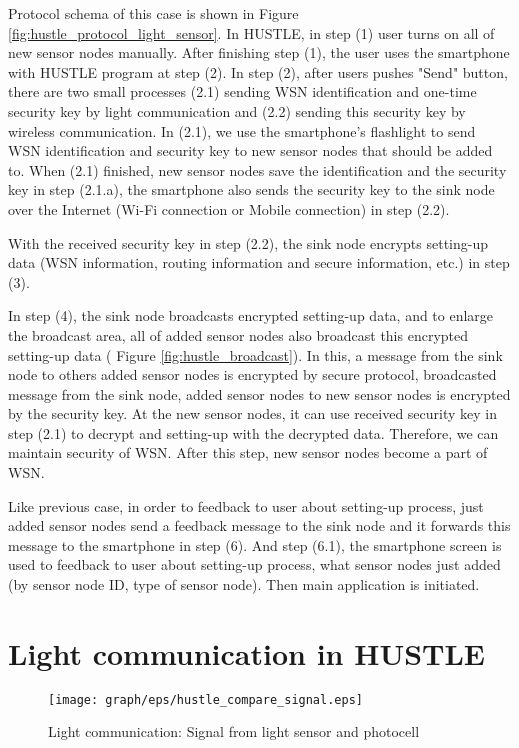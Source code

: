 Protocol schema of this case is shown in Figure \ref{fig:hustle_protocol_light_sensor}. In HUSTLE, in step (1) user turns on all of new sensor nodes manually. After finishing step (1), the user uses the smartphone with HUSTLE program at step (2). In step (2), after users pushes "Send" button, there are two small processes (2.1) sending WSN identification and one-time security key by light communication and (2.2) sending this security key by wireless communication. In (2.1), we use the smartphone's flashlight to send WSN identification and security key to new sensor nodes that should be added to. When (2.1) finished, new sensor nodes save the identification and the security key in step (2.1.a), the smartphone also sends the security key to the sink node over the Internet (Wi-Fi connection or Mobile connection) in step (2.2).

With the received security key in step (2.2), the sink node encrypts setting-up data (WSN information, routing information and secure information, etc.) in step (3).

In step (4), the sink node broadcasts encrypted setting-up data, and to enlarge the broadcast area, all of added sensor nodes also broadcast this encrypted setting-up data ( Figure \ref{fig:hustle_broadcast}). In this, a message from the sink node to others added sensor nodes is encrypted by secure protocol, broadcasted message from the sink node, added sensor nodes to new sensor nodes is encrypted by the security key. At the new sensor nodes, it can use received security key in step (2.1) to decrypt and setting-up with the decrypted data. Therefore, we can maintain security of WSN. After this step, new sensor nodes become a part of WSN.

Like previous case, in order to feedback to user about setting-up process, just added sensor nodes send a feedback message to the sink node and it forwards this message to the smartphone in step (6). And step (6.1), the smartphone screen is used to feedback to user about setting-up process, what sensor nodes just added (by sensor node ID, type of sensor node). Then main application is initiated.

\section{Light communication in HUSTLE}\label{sec:hustle_light}

\begin{figure}[tb]
\centering
\texttt{[image: graph/eps/hustle\_compare\_signal.eps]}
\caption{Light communication: Signal from light sensor and photocell}
\label{fig:hustle_compare_signal}
\end{figure}


